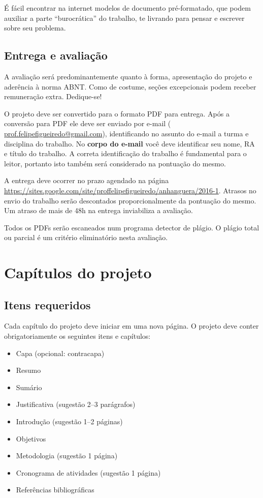 \documentclass[a4paper]{article}
\begin{document}
É fácil encontrar na internet modelos de documento pré-formatado, que podem auxiliar a parte ``burocrática'' do trabalho, te livrando para pensar e escrever sobre seu problema.

\subsection{Entrega e avaliação}

A avaliação será predominantemente quanto à forma, apresentação do projeto e aderência à norma ABNT.
Como de costume, seções excepcionais podem receber remuneração extra.
Dedique-se!

O projeto deve ser convertido para o formato PDF para entrega.
Após a conversão para PDF ele deve ser enviado por e-mail ( \url{prof.felipefigueiredo@gmail.com}), identificando no assunto do e-mail a turma e disciplina do trabalho.
No {\bf corpo do e-mail} você deve identificar seu nome, RA e título do trabalho.
A correta identificação do trabalho é fundamental para o leitor, portanto isto também será considerado na pontuação do mesmo.

A entrega deve ocorrer no prazo agendado na página \url{https://sites.google.com/site/proffelipefigueiredo/anhanguera/2016-1}.
Atrasos no envio do trabalho serão descontados proporcionalmente da pontuação do mesmo.
Um atraso de mais de 48h na entrega inviabiliza a avaliação.

Todos os PDFs serão escaneados num programa detector de plágio.
O plágio total ou parcial é um critério eliminatório nesta avaliação.

\section{Capítulos do projeto}

\subsection{Itens requeridos}

Cada capítulo do projeto deve iniciar em uma nova página.
O projeto deve conter obrigatoriamente os seguintes itens e capítulos:

\begin{itemize}
\item Capa (opcional: contracapa)
\item Resumo
\item Sumário
\item Justificativa (sugestão 2--3 parágrafos)
\item Introdução (sugestão 1--2 páginas)
\item Objetivos
\item Metodologia (sugestão 1 página)
\item Cronograma de atividades (sugestão 1 página)
\item Referências bibliográficas
\end{itemize}
\end{document}
